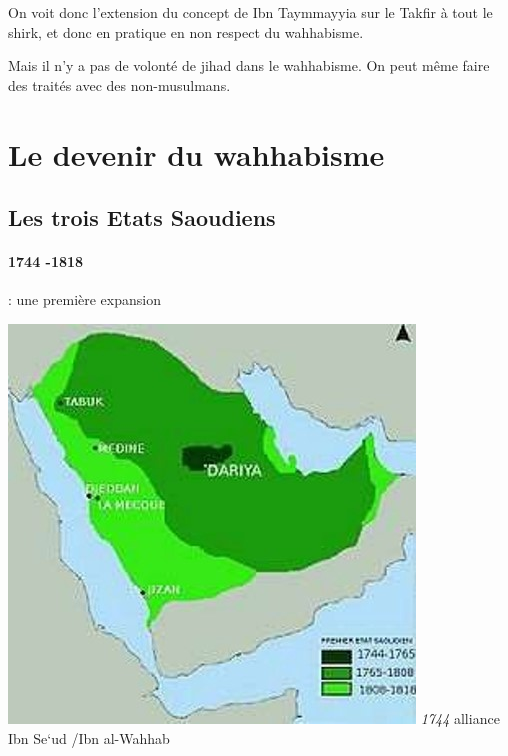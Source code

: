   \begin{Synthesis}
  On voit donc l'extension du concept de Ibn Taymmayyia sur le Takfir à tout le shirk, et donc en pratique en non respect du wahhabisme.
  \end{Synthesis}
 
 Mais il n'y a pas de volonté de jihad dans le wahhabisme. On peut même faire des traités avec des non-musulmans.
 
  \section{Le devenir du wahhabisme} 
 
  
 

\subsection{Les trois Etats Saoudiens} 

 
  {\paragraph{1744 -1818}: une première expansion}
 
 \includegraphics[width=\textwidth]{CourantsIslamContemporain/ImagesCourantsIslamContemporain/Wahhabisme1.jpg}
\emph{1744} alliance Ibn Se`ud /Ibn al-Wahhab
 
